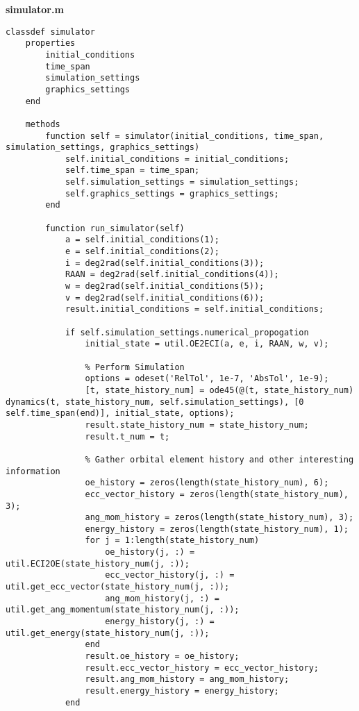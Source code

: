 \textbf{simulator.m}
\begin{lstlisting}
classdef simulator
    properties
        initial_conditions
        time_span
        simulation_settings
        graphics_settings
    end

    methods
        function self = simulator(initial_conditions, time_span, simulation_settings, graphics_settings)
            self.initial_conditions = initial_conditions;
            self.time_span = time_span;
            self.simulation_settings = simulation_settings;
            self.graphics_settings = graphics_settings;
        end

        function run_simulator(self)
            a = self.initial_conditions(1);
            e = self.initial_conditions(2);
            i = deg2rad(self.initial_conditions(3));
            RAAN = deg2rad(self.initial_conditions(4));
            w = deg2rad(self.initial_conditions(5));
            v = deg2rad(self.initial_conditions(6));
            result.initial_conditions = self.initial_conditions;

            if self.simulation_settings.numerical_propogation
                initial_state = util.OE2ECI(a, e, i, RAAN, w, v);

                % Perform Simulation
                options = odeset('RelTol', 1e-7, 'AbsTol', 1e-9);
                [t, state_history_num] = ode45(@(t, state_history_num) dynamics(t, state_history_num, self.simulation_settings), [0 self.time_span(end)], initial_state, options);
                result.state_history_num = state_history_num;
                result.t_num = t;

                % Gather orbital element history and other interesting information
                oe_history = zeros(length(state_history_num), 6);
                ecc_vector_history = zeros(length(state_history_num), 3);
                ang_mom_history = zeros(length(state_history_num), 3);
                energy_history = zeros(length(state_history_num), 1);
                for j = 1:length(state_history_num)
                    oe_history(j, :) = util.ECI2OE(state_history_num(j, :));
                    ecc_vector_history(j, :) = util.get_ecc_vector(state_history_num(j, :));
                    ang_mom_history(j, :) = util.get_ang_momentum(state_history_num(j, :));
                    energy_history(j, :) = util.get_energy(state_history_num(j, :));
                end
                result.oe_history = oe_history;
                result.ecc_vector_history = ecc_vector_history;
                result.ang_mom_history = ang_mom_history;
                result.energy_history = energy_history;
            end


\end{lstlisting}
